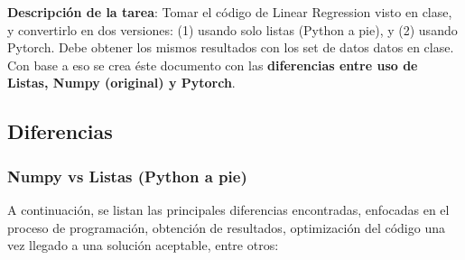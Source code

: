 \documentclass[12pt]{article}
\title{Tarea corta \textbf{#01}}
\author{Jason Carmona (\textit{200312094}) \\ Edisson López (\textit{2013103311})}
\date{Marzo 19, 2021}
\begin{document}
\maketitle

\textbf{Descripción de la tarea}: Tomar el código de Linear Regression visto en clase, y convertirlo en dos versiones: (1) usando solo listas (Python a pie), y (2) usando Pytorch. Debe obtener los mismos resultados con los set de datos datos en clase. Con base a eso se crea éste documento con las \textbf{diferencias entre uso de Listas, Numpy (original) y Pytorch}.

\subsection*{Diferencias}

\subsubsection*{Numpy vs Listas (Python a pie)}
A continuación, se listan las principales diferencias encontradas, enfocadas en el proceso de programación, obtención de resultados, optimización del código una vez llegado a una solución aceptable, entre otros:
\end{document}
